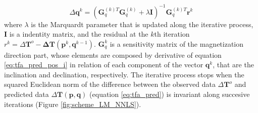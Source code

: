\begin{equation}
	\Delta \mathbf{q}^k = (\mathbf{G}_{q}^{(k)T} \mathbf{G}_{q}^{(k)} + \lambda \mathbf{I})^{-1} \mathbf{G}_{q}^{(k)T}  \mathbf{r}^k
	\label{eq:linsys_q}
\end{equation}
where $\lambda$ is the Marquardt parameter that is updated along the iterative process, $\mathbf{I}$ is a indentity matrix, and  the residual at the $k$th iteration $r^k = \Delta \mathbf{T}^o - \mathbf{\Delta T} (\mathbf{p}^k, \mathbf{q}^{k-1})$. $\mathbf{G}_q^k$ is a sensitivity matrix of the magnetization direction part, whose elements are composed by derivative of equation \ref{eq:tfa_pred_pos_i} in relation of each component of the vector $\mathbf{q}^k$, that are the inclination and declination, respectively. The iterative process stops when the squared Euclidean norm of the difference between the observed data $\Delta \mathbf{T}^{o}$ and predicted data $\Delta\mathbf{T}(\mathbf{p}, \mathbf{q})$ (equation \ref{eq:tfa_pred}) is invariant along succesive iterations (Figure \ref{fig:scheme_LM_NNLS}).


%
%
%

